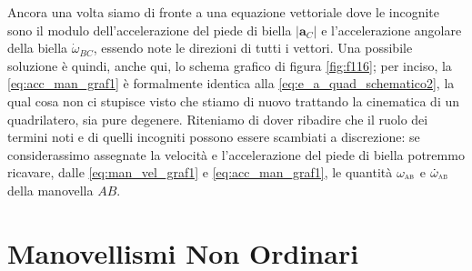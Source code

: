\noindent Ancora una volta siamo di fronte a una equazione vettoriale
dove le incognite sono
il modulo dell'accelerazione del piede di biella
$|{{\bm a}_{\scriptscriptstyle{C}}}|$ e l'accelerazione angolare della biella
${\dot\omega_{\scriptscriptstyle{BC}}}$, essendo note le direzioni di
tutti i vettori.
Una possibile soluzione \`e quindi, anche qui, 
lo schema grafico di figura \ref{fig:f116}; per inciso, la \ref{eq:acc_man_graf1} \`e formalmente identica alla \ref{eq:e_a_quad_schematico2},
la qual cosa non ci stupisce visto che stiamo di nuovo trattando
la cinematica di un quadrilatero, sia pure degenere.
Riteniamo di dover ribadire che il ruolo dei termini noti
e di quelli incogniti possono essere scambiati a discrezione: se considerassimo
assegnate la velocit\`a e l'accelerazione del piede di biella potremmo ricavare,
dalle \ref{eq:man_vel_graf1} e \ref{eq:acc_man_graf1},
le quantit\`a {${\omega_{\scalebox{.5}{AB}}}$} e
{${\dot\omega_{\scalebox{.5}{AB}}}$} della manovella $AB$.

\section{Manovellismi Non Ordinari}

